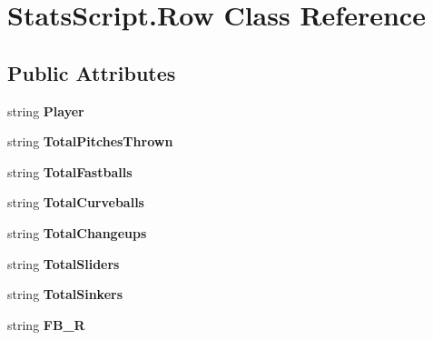 \hypertarget{class_stats_script_1_1_row}{}\section{Stats\+Script.\+Row Class Reference}
\label{class_stats_script_1_1_row}
\subsection*{Public Attributes}
\begin{DoxyCompactItemize}
\item 
string {\bfseries Player}\hypertarget{class_stats_script_1_1_row_a726e098270e63dfd5811a6ebb161c7ee}{}\label{class_stats_script_1_1_row_a726e098270e63dfd5811a6ebb161c7ee}

\item 
string {\bfseries Total\+Pitches\+Thrown}\hypertarget{class_stats_script_1_1_row_a446e03b0e948757660b9de2f5c140358}{}\label{class_stats_script_1_1_row_a446e03b0e948757660b9de2f5c140358}

\item 
string {\bfseries Total\+Fastballs}\hypertarget{class_stats_script_1_1_row_a91ff46850a7d50b1756e5604a438c692}{}\label{class_stats_script_1_1_row_a91ff46850a7d50b1756e5604a438c692}

\item 
string {\bfseries Total\+Curveballs}\hypertarget{class_stats_script_1_1_row_a154ad529555bf8bafed84f8adcf64015}{}\label{class_stats_script_1_1_row_a154ad529555bf8bafed84f8adcf64015}

\item 
string {\bfseries Total\+Changeups}\hypertarget{class_stats_script_1_1_row_adae614166afa7dfe9c8cdafedd349a4c}{}\label{class_stats_script_1_1_row_adae614166afa7dfe9c8cdafedd349a4c}

\item 
string {\bfseries Total\+Sliders}\hypertarget{class_stats_script_1_1_row_a70e875c9357bb1d99cbc84680045c558}{}\label{class_stats_script_1_1_row_a70e875c9357bb1d99cbc84680045c558}

\item 
string {\bfseries Total\+Sinkers}\hypertarget{class_stats_script_1_1_row_a911401cbb3078133e1f9937a59bc449f}{}\label{class_stats_script_1_1_row_a911401cbb3078133e1f9937a59bc449f}

\item 
string {\bfseries F\+B\+\_\+R}\hypertarget{class_stats_script_1_1_row_abd0cb82608fd96d57ecab9a7989c6974}{}\label{class_stats_script_1_1_row_abd0cb82608fd96d57ecab9a7989c6974}


\end{DoxyCompactItemize}
